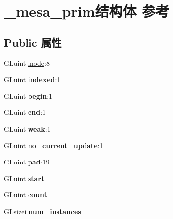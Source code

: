 \hypertarget{struct__mesa__prim}{}\section{\+\_\+mesa\+\_\+prim结构体 参考}
\label{struct__mesa__prim}
\subsection*{Public 属性}
\begin{DoxyCompactItemize}
\item 
G\+Luint \hyperlink{struct__mesa__prim_aabdd6cc399a4b144bc626b4633e326e0}{mode}\+:8
\item 
\mbox{\label{struct__mesa__prim_a7eb35317b8ea3073d4029a48e327a815}} 
G\+Luint {\bfseries indexed}\+:1
\item 
\mbox{\label{struct__mesa__prim_a3ac4803ac4ef79f48797aa80db30aa14}} 
G\+Luint {\bfseries begin}\+:1
\item 
\mbox{\label{struct__mesa__prim_a96e9496d3fb7fda2247dea827109cd06}} 
G\+Luint {\bfseries end}\+:1
\item 
\mbox{\label{struct__mesa__prim_a81a7ea6cae613a80ef44e50cda030a43}} 
G\+Luint {\bfseries weak}\+:1
\item 
\mbox{\label{struct__mesa__prim_a2e796065ecf45639d3880b2af1b7c606}} 
G\+Luint {\bfseries no\+\_\+current\+\_\+update}\+:1
\item 
\mbox{\label{struct__mesa__prim_a9e8d2c81b236ddb667944952df89136a}} 
G\+Luint {\bfseries pad}\+:19
\item 
\mbox{\label{struct__mesa__prim_ac56d021e2a50d7265b412103501faf9e}} 
G\+Luint {\bfseries start}
\item 
\mbox{\label{struct__mesa__prim_a686f813c941985fa8c93816db9339d04}} 
G\+Luint {\bfseries count}
\item 
\mbox{\label{struct__mesa__prim_a4efc23542cfabb238d41e74bd4af6af5}} 
G\+Lsizei {\bfseries num\+\_\+instances}
\end{DoxyCompactItemize}


